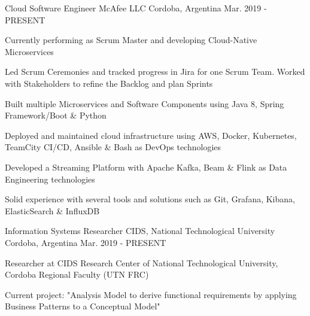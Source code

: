 

\begin{cventries}

  \cventry
    {Cloud Software Engineer} %
    {McAfee LLC} %
    {Cordoba, Argentina} %
    {Mar. 2019 - PRESENT} %
    {
      \begin{cvitems} %
        \item {Currently performing as Scrum Master and developing Cloud-Native Microservices}
        \item {Led Scrum Ceremonies and tracked progress in Jira for one Scrum Team. Worked with Stakeholders to refine the Backlog and plan Sprints}
        \item {Built multiple Microservices and Software Components using Java 8, Spring Framework/Boot \& Python}
        \item {Deployed and maintained cloud infrastructure using AWS, Docker, Kubernetes, TeamCity CI/CD, Ansible \& Bash as DevOps technologies}
        \item {Developed a Streaming Platform with Apache Kafka, Beam \& Flink as Data Engineering technologies}
        \item {Solid experience with several tools and solutions such as Git, Grafana, Kibana, ElasticSearch \& InfluxDB}
      \end{cvitems}
    }

  \cventry
    {Information Systems Researcher} %
    {CIDS, National Technological University} %
    {Cordoba, Argentina} %
    {Mar. 2019 - PRESENT} %
    {
      \begin{cvitems} %
        \item {Researcher at CIDS Research Center of National Technological University, Cordoba Regional Faculty (UTN FRC)}
        \item {Current project: "Analysis Model to derive functional requirements by applying Business Patterns to a Conceptual Model"}
      \end{cvitems}
    }


\end{cventries}
